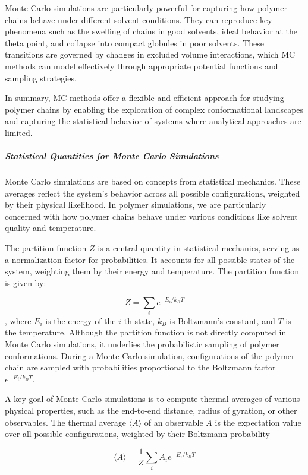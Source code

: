 \documentclass{article}      %
\begin{document}
Monte Carlo simulations are particularly powerful for capturing how polymer chains behave under different solvent conditions. They can reproduce key phenomena such as the swelling of chains in good solvents, ideal behavior at the theta point, and collapse into compact globules in poor solvents. These transitions are governed by changes in excluded volume interactions, which MC methods can model effectively through appropriate potential functions and sampling strategies.

In summary, MC methods offer a flexible and efficient approach for studying polymer chains by enabling the exploration of complex conformational landscapes and capturing the statistical behavior of systems where analytical approaches are limited.

\subparagraph{Statistical Quantities for Monte Carlo Simulations}

Monte Carlo simulations are based on concepts from statistical mechanics. These averages reflect the system’s behavior across all possible configurations, weighted by their physical likelihood. In polymer simulations, we are particularly concerned with how polymer chains behave under various conditions like solvent quality and temperature.

The partition function \( Z \) is a central quantity in statistical mechanics, serving as a normalization factor for probabilities. It accounts for all possible states of the system, weighting them by their energy and temperature. The partition function is given by:

\[
Z = \sum_i e^{-E_i / k_B T}
\]
, where \( E_i \) is the energy of the \( i \)-th state, \( k_B \) is Boltzmann’s constant, and \( T \) is the temperature. Although the partition function is not directly computed in Monte Carlo simulations, it underlies the probabilistic sampling of polymer conformations. During a Monte Carlo simulation, configurations of the polymer chain are sampled with probabilities proportional to the Boltzmann factor \( e^{-E_i / k_B T} \).

A key goal of Monte Carlo simulations is to compute thermal averages of various physical properties, such as the end-to-end distance, radius of gyration, or other observables. The thermal average \( \langle A \rangle \) of an observable \( A \) is the expectation value over all possible configurations, weighted by their Boltzmann probability

\[
\langle A \rangle = \frac{1}{Z} \sum_i A_i e^{-E_i / k_B T}
\]
\end{document}
